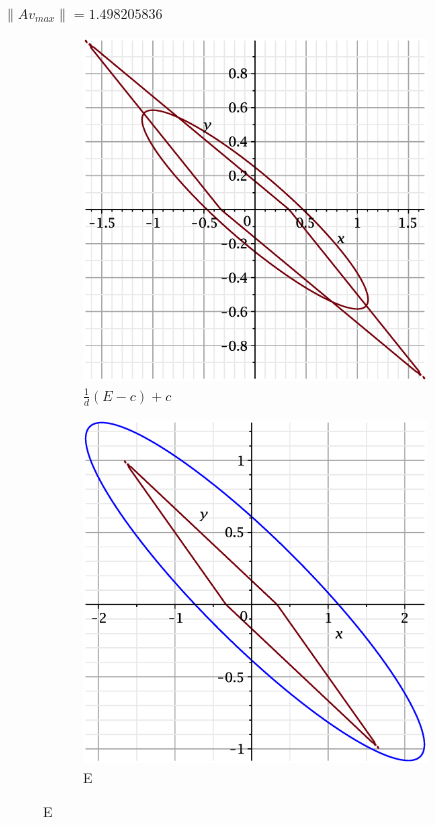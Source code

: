 \documentclass{beamer}
\begin{document}
\begin{frame}
$\|Av_{max}\| = 1.498205836$  
    \begin{figure}
    \begin{subfigure}{.5\textwidth}
        \centering
        \includegraphics[width=.8\linewidth]{pictures/4.eps}
        \caption{$\displaystyle\frac{1}{d}(E-c)+c$}
    \label{fig:sfig1}
    \end{subfigure}%
    \begin{subfigure}{.5\textwidth}
        \centering
        \includegraphics[width=.8\linewidth]{pictures/1_4.eps}
        \caption{E}
    \label{fig:sfig2}
    \end{subfigure}
\end{figure}

\end{frame}
\end{document}
